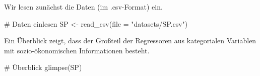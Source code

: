 \documentclass[
  a4paper,
  DIV=11,
  oneside]{scrreprt}
\newenvironment{Shaded}{\begin{snugshade}}{\end{snugshade}}
\newcommand{\AttributeTok}[1]{\textcolor[rgb]{0.40,0.45,0.13}{#1}}
\newcommand{\CommentTok}[1]{\textcolor[rgb]{0.37,0.37,0.37}{#1}}
\newcommand{\FunctionTok}[1]{\textcolor[rgb]{0.28,0.35,0.67}{#1}}
\newcommand{\NormalTok}[1]{\textcolor[rgb]{0.00,0.23,0.31}{#1}}
\newcommand{\OtherTok}[1]{\textcolor[rgb]{0.00,0.23,0.31}{#1}}
\newcommand{\StringTok}[1]{\textcolor[rgb]{0.13,0.47,0.30}{#1}}
\begin{document}
Wir lesen zunächst die Daten (im .csv-Format) ein.

\begin{Shaded}
\begin{Highlighting}[]
\CommentTok{\# Daten einlesen}
\NormalTok{SP }\OtherTok{\textless{}{-}} \FunctionTok{read\_csv}\NormalTok{(}\AttributeTok{file =} \StringTok{"datasets/SP.csv"}\NormalTok{)}
\end{Highlighting}
\end{Shaded}

Ein Überblick zeigt, dass der Großteil der Regressoren aus kategorialen
Variablen mit sozio-ökonomischen Informationen besteht.

\begin{Shaded}
\begin{Highlighting}[]
\CommentTok{\# Überblick}
\FunctionTok{glimpse}\NormalTok{(SP)}
\end{Highlighting}
\end{Shaded}
\end{document}
